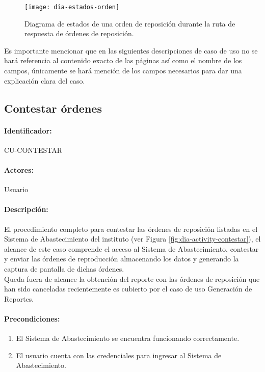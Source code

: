 \begin{figure}[h]
  \centering
  \texttt{[image: dia-estados-orden]} 
  \caption{Diagrama de estados de una orden de reposición durante la ruta de respuesta de órdenes de reposición.}
  \label{fig:dia-estados-orden}
\end{figure}

Es importante mencionar que en las siguientes descripciones de caso de uso no se hará referencia al contenido exacto de las páginas así como el nombre de los campos, únicamente se hará mención de los campos necesarios para dar una explicación clara del caso.

\subsection{Contestar órdenes}\label{cu-contestar}
\paragraph{Identificador:}
CU-CONTESTAR
\paragraph{Actores:}
Usuario
\paragraph{Descripción:}
El procedimiento completo para contestar las órdenes de reposición listadas en el Sistema de Abastecimiento del instituto (ver Figura \ref{fig:dia-activity-contestar}), el alcance de este caso comprende el acceso al Sistema de Abastecimiento, contestar y enviar las órdenes de reproducción almacenando los datos y generando la captura de pantalla de dichas órdenes.\\
Queda fuera de alcance la obtención del reporte con las órdenes de reposición que han sido canceladas recientemente es cubierto por el caso de uso Generación de Reportes.
\paragraph{Precondiciones:}
\begin{enumerate}
  \item El Sistema de Abastecimiento se encuentra funcionando correctamente.
  \item El usuario cuenta con las credenciales para ingresar al Sistema de Abastecimiento.
\end{enumerate}
